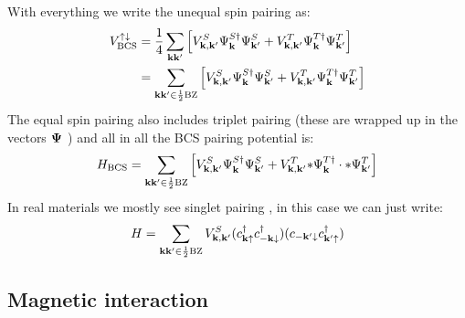 With everything we write the unequal spin pairing as:
\begin{align}
    V_{\text{BCS}}^{\uparrow \downarrow} &= \frac{1}{4} \sum_{\mathbf{k} \mathbf{k}^{\prime}} \left[ V_{\mathbf{k}, \mathbf{k}^{\prime}}^S \Psi_{\mathbf{k}}^{S \dagger} \Psi_{\mathbf{k}^{\prime}}^{S} + V_{\mathbf{k}, \mathbf{k}^{\prime}}^T \Psi_{\mathbf{k}}^{T \dagger} \Psi_{\mathbf{k}^{\prime}}^{T} \right] \\
    &= \sum_{\mathbf{k} \mathbf{k}^{\prime} \in \frac{1}{2} \text{BZ}} \left[ V_{\mathbf{k}, \mathbf{k}^{\prime}}^S \Psi_{\mathbf{k}}^{S \dagger} \Psi_{\mathbf{k}^{\prime}}^{S} + V_{\mathbf{k}, \mathbf{k}^{\prime}}^T \Psi_{\mathbf{k}}^{T \dagger} \Psi_{\mathbf{k}^{\prime}}^{T} \right]
\end{align}
The equal spin pairing also includes triplet pairing (these are wrapped up in the vectors \(\mathbf{\Psi}\) ) and all in all the BCS pairing potential is:
\begin{align}
    H_{\text{BCS}} = \sum_{\mathbf{k} \mathbf{k}^{\prime} \in \frac{1}{2} \text{BZ}} \left[ V_{\mathbf{k}, \mathbf{k}^{\prime}}^S \Psi_{\mathbf{k}}^{S \dagger} \Psi_{\mathbf{k}^{\prime}}^{S} + V_{\mathbf{k}, \mathbf{k}^{\prime}}^T \mathbf{*}{\Psi}_{\mathbf{k}}^{T \dagger} \cdot \mathbf{*}{\Psi}_{\mathbf{k}^{\prime}}^{T} \right]
\end{align}
In real materials we mostly see singlet pairing  , in this case we can just write:
\begin{equation}
    H = \sum_{\mathbf{k} \mathbf{k}^{\prime} \in \frac{1}{2} \text{BZ}} V_{\mathbf{k}, \mathbf{k}^{\prime}}^S
    (c_{\mathbf{k} \uparrow}^{\dagger}
    c_{-\mathbf{k} \downarrow}^{\dagger})
    (c_{-\mathbf{k}^{\prime} \downarrow}
    c_{\mathbf{k}^{\prime} \uparrow}^{\dagger})
\end{equation}


\subsection{Magnetic interaction}

